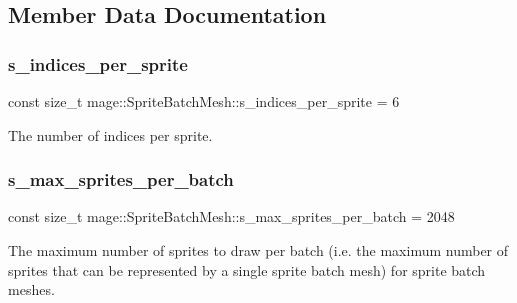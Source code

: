 \subsection{Member Data Documentation}
\hypertarget{classmage_1_1_sprite_batch_mesh_a9560987925304ec757cac212d8b921f5}{}\label{classmage_1_1_sprite_batch_mesh_a9560987925304ec757cac212d8b921f5} 
\subsubsection{\texorpdfstring{s\+\_\+indices\+\_\+per\+\_\+sprite}{s\_indices\_per\_sprite}}
{\footnotesize\ttfamily const size\+\_\+t mage\+::\+Sprite\+Batch\+Mesh\+::s\+\_\+indices\+\_\+per\+\_\+sprite = 6\hspace{0.3cm}{\ttfamily [static]}}

The number of indices per sprite. \hypertarget{classmage_1_1_sprite_batch_mesh_aa4c18beb1d7355a184ac3c93c6a254e3}{}\label{classmage_1_1_sprite_batch_mesh_aa4c18beb1d7355a184ac3c93c6a254e3} 
\subsubsection{\texorpdfstring{s\+\_\+max\+\_\+sprites\+\_\+per\+\_\+batch}{s\_max\_sprites\_per\_batch}}
{\footnotesize\ttfamily const size\+\_\+t mage\+::\+Sprite\+Batch\+Mesh\+::s\+\_\+max\+\_\+sprites\+\_\+per\+\_\+batch = 2048\hspace{0.3cm}{\ttfamily [static]}}

The maximum number of sprites to draw per batch (i.\+e. the maximum number of sprites that can be represented by a single sprite batch mesh) for sprite batch meshes. \hypertarget{classmage_1_1_sprite_batch_mesh_accc52fa93a3c7d42e2d4db54c1211d5d}{}\label{classmage_1_1_sprite_batch_mesh_accc52fa93a3c7d42e2d4db54c1211d5d} 
